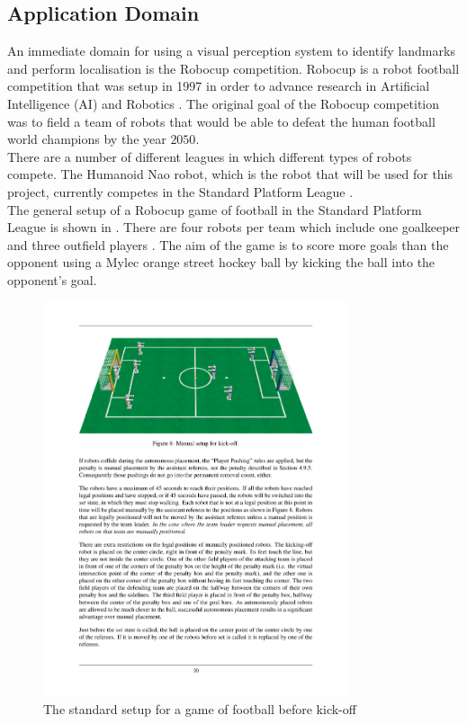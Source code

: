 \documentclass[11pt]{report}
\begin{document}
\subsection{Application Domain}
\label{sec:domain}
An immediate domain for using a visual perception system to identify landmarks and perform localisation is the Robocup competition. Robocup is a robot football competition that was setup in 1997 in order to advance research in Artificial Intelligence (AI) and Robotics \cite{Robocup}. The original goal of the Robocup competition was to field a team of robots that would be able to defeat the human football world champions by the year $2050$.\\

There are a number of different leagues in which different types of robots compete. The Humanoid Nao robot, which is the robot that will be used for this project, currently competes in the Standard Platform League \cite{StandardPlatform}.\\

The general setup of a Robocup game of football in the Standard Platform League is shown in . There are four robots per team which include one goalkeeper and three outfield players \cite{Rules}. The aim of the game is to score more goals than the opponent using a Mylec orange street hockey ball by kicking the ball into the opponent's goal.\\

\begin{figure}[h!] 
  \centering
    \includegraphics[width=0.8\textwidth]{../Drawings/robocup/NaoField.pdf}
    \caption{The standard setup for a game of football before kick-off \cite{Rules}}
    \label{fig:naofield}
\end{figure}
\end{document}
